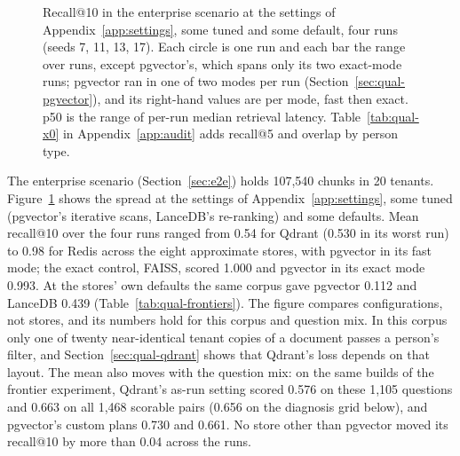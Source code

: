 \begin{figure}[tbp]
\caption{Recall@10 in the enterprise scenario at the settings of Appendix~\ref{app:settings}, some tuned and some default,
four runs (seeds 7, 11, 13, 17). Each circle is one run and each bar the range over runs, except pgvector's, which spans only its
two exact-mode runs; pgvector ran in one of two modes per run (Section~\ref{sec:qual-pgvector}), and its right-hand values are per
mode, fast then exact. p50 is the range of
per-run median retrieval latency. Table~\ref{tab:qual-x0} in Appendix~\ref{app:audit} adds recall@5 and overlap by
person type.}
\label{fig:qual-audit}
\end{figure}

The enterprise scenario (Section~\ref{sec:e2e}) holds 107,540 chunks in 20 tenants. Figure~\ref{fig:qual-audit} shows
the spread at the settings of Appendix~\ref{app:settings}, some tuned (pgvector's iterative scans, LanceDB's re-ranking) and some defaults.
Mean recall@10 over the four runs
ranged from 0.54 for Qdrant (0.530 in its worst run) to 0.98 for Redis across the eight approximate stores, with
pgvector in its fast mode; the exact control, FAISS, scored 1.000 and pgvector in its exact mode 0.993. At the stores' own defaults the same
corpus gave pgvector 0.112 and LanceDB 0.439 (Table~\ref{tab:qual-frontiers}). The figure
compares configurations, not stores, and its numbers hold for this corpus and question mix. In this corpus only one of twenty near-identical tenant copies of a document
passes a person's filter, and Section~\ref{sec:qual-qdrant} shows that Qdrant's loss depends on that layout. The mean also moves with the question mix: on the same builds of the
frontier experiment, Qdrant's as-run setting scored 0.576 on these 1,105 questions and 0.663 on all 1,468 scorable pairs (0.656 on the diagnosis grid below), and pgvector's custom plans 0.730 and 0.661. No store other than pgvector moved its recall@10 by more than 0.04 across the runs.

